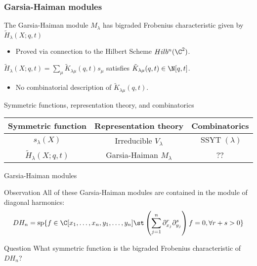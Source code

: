 \documentclass[dvipsnames,handout]{beamer}
\newcommand{\Htild}{\tilde{H}}
\renewcommand{\Span}{\operatorname{sp}}
\DeclareMathOperator{\SSYT}{SSYT}
\theoremstyle{definition}
\newcounter{c}
\begin{document}
\begin{frame}
  \frametitle{Garsia-Haiman modules}
  \begin{theorem}[Haiman, 2001]
    The Garsia-Haiman module \(M_\lambda\) has bigraded Frobenius
    characteristic given by \(\tilde{H}_\lambda(X;q,t)\)
  \end{theorem}\pause
  \begin{itemize}
  \item Proved via connection to the Hilbert Scheme \(Hilb^n(\C^2)\).\pause
  \end{itemize}
  \begin{corollary}
    \(\tilde{H}_\lambda(X;q,t) = \sum_\mu \tilde{K}_{\lambda \mu}(q,t) s_\mu\)
    satisfies \(\tilde{K}_{\lambda \mu}(q,t) \in \N[q,t]\).
  \end{corollary}\pause
  \begin{itemize}
  \item No combinatorial description of \(\tilde{K}_{\lambda \mu}(q,t)\).
  \end{itemize}
  \end{frame}
  \begin{frame}{Symmetric functions, representation theory, and combinatorics}
    \begin{tabular}{ccc}
      Symmetric function & Representation theory & Combinatorics 
      \\
      \hline
      \(s_\lambda(X)\) & Irreducible \(V_\lambda\) & \(\SSYT(\lambda)\) \\
      \(\Htild_\lambda(X;q,t)\) & Garsia-Haiman \(M_\lambda\) & ??
    \end{tabular}
  \end{frame}
  \begin{frame}{Garsia-Haiman modules}
  \begin{block}{Observation}
    All of these Garsia-Haiman modules are contained in the module of
    diagonal harmonics:  \[
      DH_n = \Span\{ f \in \C[x_1,\ldots,x_n,y_1,\ldots,y_n] \st
      \left(\sum_{j=1}^n \partial_{x_j}^r \partial_{y_j}^s\right) f = 0, \forall r+s>0\}
    \]
  \end{block}\pause
  \begin{block}{Question}
    What symmetric function is the bigraded Frobenius characteristic
    of \(DH_n\)?
  \end{block}
\end{frame}
\end{document}
